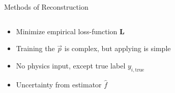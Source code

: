 \begin{frame}{Methods of Reconstruction}
\begin{columns}[T]
\begin{column}{.4\textwidth}
            \begin{itemize}
                \item Minimize empirical loss-function $\mathbf L$
                \item Training the $\vec p$ is complex, but applying is simple
                \item No physics input, except true label $y_{i,\mathrm{true}}$
                \item Uncertainty from estimator $\hat f$
            \end{itemize}
        \end{column}
    \end{columns}
\end{frame}